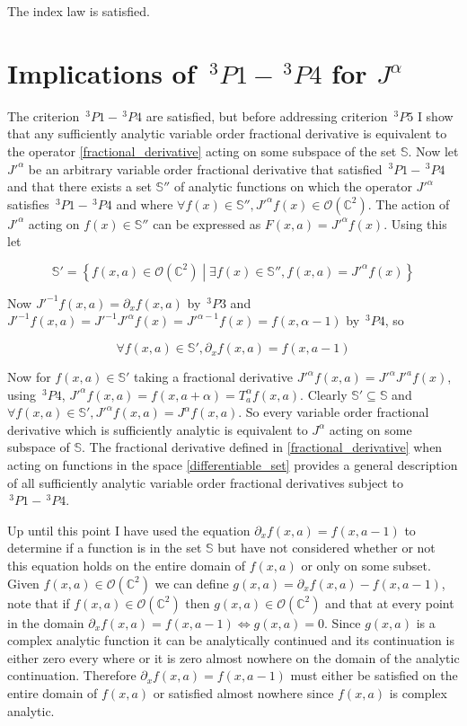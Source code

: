\documentclass[%
 onecolumn,
 amsmath, amssymb, aps, pra, 10pt
]{revtex4-2}
\begin{document}
The index law is satisfied.

\section*{Implications of $\,^3P1 - \,^3P4$ for $J^{\alpha}$}

The criterion $\,^3P1 - \,^3P4$ are satisfied, but before addressing criterion $\,^3P5$ I show that any sufficiently analytic variable order fractional derivative is equivalent to the operator \eqref{fractional_derivative} acting on some subspace of the set $\mathbb{S}$. Now let $J'^{\alpha}$ be an arbitrary variable order fractional derivative that satisfied $\,^3P1 - \,^3P4$ and that there exists a set $\mathbb{S}''$ of analytic functions on which the operator $J'^{\alpha}$ satisfies $\,^3P1 - \,^3P4$ and where $\forall f(x) \in \mathbb{S}'', J'^{\alpha}f(x) \in \mathcal{O}(\mathbb{C}^2)$. The action of $J'^{\alpha}$ acting on $f(x) \in \mathbb{S}''$ can be expressed as $F(x, a) = J'^{\alpha} f(x)$. Using this let

$$\mathbb{S}' = \left\lbrace f(x, a) \in \mathcal{O}(\mathbb{C}^2) \middle| \exists f(x) \in \mathbb{S}'', f(x, a) = J'^{\alpha} f(x) \right\rbrace$$

Now $J'^{-1}f(x, a) = \partial_x f(x, a)$ by $\,^3P3$ and $J'^{-1} f(x, a) = J'^{-1}J'^{\alpha} f(x) = J'^{\alpha - 1} f(x) = f(x, \alpha - 1)$ by $\,^3P4$, so

$$\forall f(x, a) \in \mathbb{S}', \partial_x f(x, a) = f(x, a - 1)$$

Now for $f(x, a) \in \mathbb{S}'$ taking a fractional derivative $J'^{\alpha} f(x, a) = J'^{\alpha}J'^{a} f(x)$, using $\,^3P4$, $J'^{\alpha} f(x, a) = f(x, a + \alpha) = T_{a}^{\alpha} f(x, a)$. Clearly $\mathbb{S}' \subseteq \mathbb{S}$ and $\forall f(x, a) \in \mathbb{S}', J'^{\alpha} f(x, a) = J^{\alpha} f(x, a)$. So every variable order fractional derivative which is sufficiently analytic is equivalent to $J^{\alpha}$ acting on some subspace of $\mathbb{S}$. The fractional derivative defined in \eqref{fractional_derivative} when acting on functions in the space \eqref{differentiable_set} provides a general description of all sufficiently analytic variable order fractional derivatives subject to $\,^3P1 - \,^3P4$.

Up until this point I have used the equation $\partial_x f(x, a) = f(x, a - 1)$ to determine if a function is in the set $\mathbb{S}$ but have not considered whether or not this equation holds on the entire domain of $f(x, a)$ or only on some subset. Given $f(x, a) \in \mathcal{O}(\mathbb{C}^2)$ we can define $g(x, a) = \partial_x f(x, a) - f(x, a - 1)$, note that if $f(x, a) \in \mathcal{O}(\mathbb{C}^2)$ then $g(x, a) \in \mathcal{O}(\mathbb{C}^2)$ and that at every point in the domain $\partial_x f(x, a) = f(x, a - 1) \iff g(x, a) = 0$. Since $g(x, a)$ is a complex analytic function it can be analytically continued and its continuation is either zero every where or it is zero almost nowhere on the domain of the analytic continuation. Therefore $\partial_x f(x, a) = f(x, a - 1)$ must either be satisfied on the entire domain of $f(x, a)$ or satisfied almost nowhere since $f(x, a)$ is complex analytic.
\end{document}
